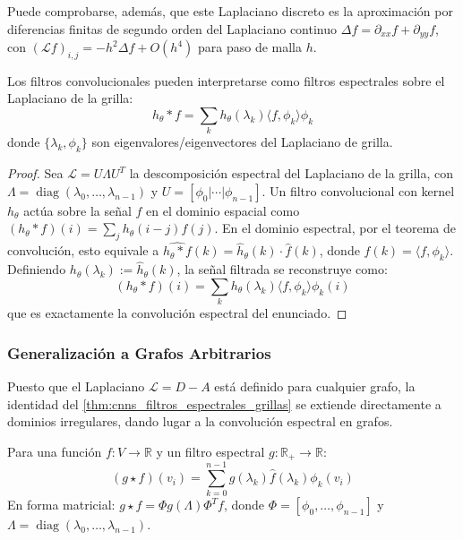Puede comprobarse, además, que este Laplaciano discreto es la aproximación por diferencias finitas de segundo orden del Laplaciano continuo $\Delta f = \partial_{xx} f + \partial_{yy} f$, con $(\mathcal{L}f)_{i,j} = -h^2 \Delta f + O(h^4)$ para paso de malla $h$.

\begin{theorem}\label{thm:cnns_filtros_espectrales_grillas}
Los filtros convolucionales pueden interpretarse como filtros
espectrales sobre el Laplaciano de la grilla:
\[
h_\theta * f = \sum_k h_\theta(\lambda_k)\langle f, \phi_k\rangle\phi_k
\]
donde \(\{\lambda_k, \phi_k\}\) son eigenvalores/eigenvectores del Laplaciano de grilla.
\end{theorem}

\begin{proof}
Sea $\mathcal{L} = U \Lambda U^T$ la descomposición espectral del Laplaciano de la grilla, con $\Lambda = \operatorname{diag}(\lambda_0, \ldots, \lambda_{n-1})$ y $U = [\phi_0 | \cdots | \phi_{n-1}]$. Un filtro convolucional con kernel $h_\theta$ actúa sobre la señal $f$ en el dominio espacial como $(h_\theta * f)(i) = \sum_j h_\theta(i-j) f(j)$. En el dominio espectral, por el teorema de convolución, esto equivale a $\widehat{h_\theta * f}(k) = \hat{h}_\theta(k) \cdot \hat{f}(k)$, donde $\hat{f}(k) = \langle f, \phi_k \rangle$. Definiendo $h_\theta(\lambda_k) := \hat{h}_\theta(k)$, la señal filtrada se reconstruye como:
\[
(h_\theta * f)(i) = \sum_k h_\theta(\lambda_k) \langle f, \phi_k \rangle \phi_k(i)
\]
que es exactamente la convolución espectral del enunciado.
\end{proof}

\subsubsection{Generalización a Grafos Arbitrarios}

Puesto que el Laplaciano $\mathcal{L} = D - A$ está definido para cualquier grafo, la identidad del \autoref{thm:cnns_filtros_espectrales_grillas} se extiende directamente a dominios irregulares, dando lugar a la convolución espectral en grafos.

\begin{definition}\label{def:convolucion_espectral_grafos}
Para una función $f: V \to \mathbb{R}$ y un filtro espectral $g: \mathbb{R}_+ \to \mathbb{R}$:
\begin{equation}
(g \star f)(v_i) = \sum_{k=0}^{n-1} g(\lambda_k) \hat{f}(\lambda_k) \phi_k(v_i)
\end{equation}
En forma matricial: $g \star f = \Phi g(\Lambda) \Phi^T f$, donde $\Phi = [\phi_0, \ldots, \phi_{n-1}]$ y $\Lambda = \operatorname{diag}(\lambda_0, \ldots, \lambda_{n-1})$.
\end{definition}

